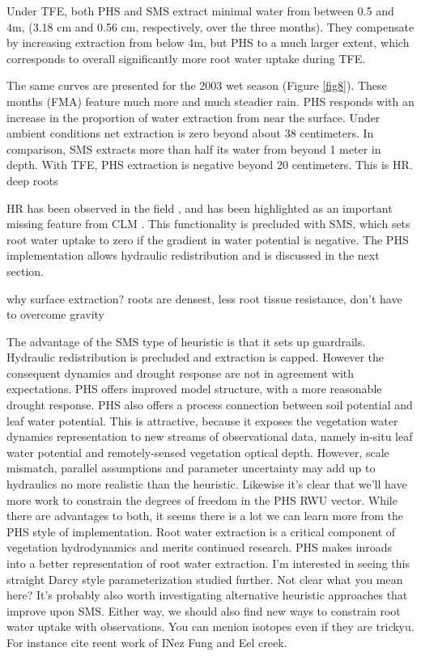\documentclass[draft,linenumbers]{agujournal}
\begin{document}
Under TFE, both PHS and SMS extract minimal water from between 0.5 and 4m, (3.18 cm and 0.56 cm, respectively, over the three months).
They compensate by increasing extraction from below 4m, but PHS to a much larger extent, which corresponds to overall significantly more root water uptake during TFE.

The same curves are presented for the 2003 wet season (Figure \ref{fig8}).
These months (FMA) feature much more and much steadier rain.
PHS responds with an increase in the proportion of water extraction from near the surface.
Under ambient conditions net extraction is zero beyond about 38 centimeters.
In comparison, SMS extracts more than half its water from beyond 1 meter in depth.
With TFE, PHS extraction is negative beyond 20 centimeters.
This is HR.
deep roots \citep{nepstad1994}

HR has been observed in the field \citep{oliveira2005}, and has been highlighted as an important missing feature from CLM \citep{lee2005}.
This functionality is precluded with SMS, which sets root water uptake to zero if the gradient in water potential is negative. 
The PHS implementation allows hydraulic redistribution and is discussed in the next section.

why surface extraction?
roots are densest, less root tissue resistance, don't have to overcome gravity

The advantage of the SMS type of heuristic is that it sets up guardrails.
Hydraulic redistribution is precluded and extraction is capped.
However the consequent dynamics and drought response are not in agreement with expectations.
PHS offers improved model structure, with a more reasonable drought response.
PHS also offers a process connection between soil potential and leaf water potential.
This is attractive, because it exposes the vegetation water dynamics representation to new streams of observational data, 
namely in-situ leaf water potential and remotely-sensed vegetation optical depth.
However, scale mismatch, parallel assumptions and parameter uncertainty may add up to hydraulics no more realistic than the heuristic.
Likewise it's clear that we'll have more work to constrain the degrees of freedom in the PHS RWU vector.
While there are advantages to both, it seems there is a lot we can learn more from the PHS style of implementation.
Root water extraction is a critical component of vegetation hydrodynamics and merits continued research.
PHS makes inroads into a better representation of root water extraction.
I'm interested in seeing this straight Darcy style parameterization studied further. Not clear what you mean here? 
It's probably also worth investigating alternative heuristic approaches that improve upon SMS.
Either way, we should also find new ways to constrain root water uptake with observations. You can menion isotopes even if they are trickyu. For instance cite reent work of INez Fung and Eel creek.
\end{document}
